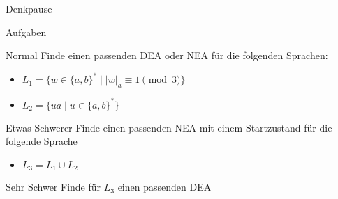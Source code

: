 %

{
\begin{frame}{Denkpause}
    \footnotesize
    \begin{alertblock}{Aufgaben}
    \end{alertblock}
    \begin{block}{Normal}
        Finde einen passenden DEA oder NEA für die folgenden Sprachen:
        \begin{itemize}
            \item $L_1 = \{w \in \{a,b\}^* \mid |w|_a \equiv 1 \pmod{3}\}$
            \item $L_2 = \{ua\mid u \in \{a,b\}^*\}$
        \end{itemize}
    \end{block}
    \begin{block}{Etwas Schwerer}
        Finde einen passenden NEA mit \alert{einem} Startzustand für die folgende Sprache
        \begin{itemize}
            \item $L_3 = L_1 \cup L_2$
        \end{itemize}
    \end{block}
    \begin{block}{Sehr Schwer}
        Finde für $L_3$ einen passenden DEA
    \end{block}
\end{frame}
}

